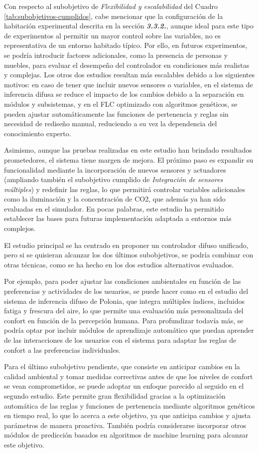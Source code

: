 Con respecto al subobjetivo de \textit{Flexibilidad y escalabilidad} del Cuadro \ref{tab:subobjetivos-cumplidos}, cabe mencionar que la configuración de la habitación experimental descrita en la sección \textbf{\textit{3.3.2.}}, aunque ideal para este tipo de experimentos al permitir un mayor control sobre las variables, no es representativa de un entorno habitado típico. Por ello, en futuros experimentos, se podría introducir factores adicionales, como la presencia de personas y muebles, para evaluar el desempeño del controlador en condiciones más realistas y complejas. Los otros dos estudios resultan más escalables debido a los siguientes motivos: en caso de tener que incluir nuevos sensores o variables, en el sistema de inferencia difusa se reduce el impacto de los cambios debido a la separación en módulos y subsistemas, y en el FLC optimizado con algoritmos genéticos, se pueden ajustar automáticamente las funciones de pertenencia y reglas sin necesidad de rediseño manual, reduciendo a su vez la dependencia del conocimiento experto.

Asimismo, aunque las pruebas realizadas en este estudio han brindado resultados prometedores, el sistema tiene margen de mejora. El próximo paso es expandir su funcionalidad mediante la incorporación de nuevos sensores y actuadores (ampliando también el subobjetivo cumplido de \textit{Integración de sensores múltiples}) y redefinir las reglas, lo que permitirá controlar variables adicionales como la iluminación y la concentración de CO2, que además ya han sido evaluadas en el simulador. En pocas palabras, este estudio ha permitido establecer las bases para futuras implementación adaptada a entornos más complejos.

El estudio principal se ha centrado en proponer un controlador difuso unificado, pero si se quisieran alcanzar los dos últimos subobjetivos, se podría combinar con otras técnicas, como se ha hecho en los dos estudios alternativos evaluados.

Por ejemplo, para poder ajustar las condiciones ambientales en función de las preferencias y actividades de los usuarios, se puede hacer como en el estudio del sistema de inferencia difuso de Polonia, que integra múltiples índices, incluidos fatiga y frescura del aire, lo que permite una evaluación más personalizada del confort en función de la percepción humana. Para profundizar todavía más, se podría optar por incluir módulos de aprendizaje automático que puedan aprender de las interacciones de los usuarios con el sistema para adaptar las reglas de confort a las preferencias individuales.

Para el último subobjetivo pendiente, que consiste en anticipar cambios en la calidad ambiental y tomar medidas correctivas antes de que los niveles de confort se vean comprometidos, se puede adoptar un enfoque parecido al seguido en el segundo estudio. Este permite gran flexibilidad gracias a la optimización automática de las reglas y funciones de pertenencia mediante algoritmos genéticos en tiempo real, lo que lo acerca a este objetivo, ya que anticipa cambios y ajusta parámetros de manera proactiva. También podría considerarse incorporar otros módulos de predicción basados en algoritmos de machine learning para alcanzar este objetivo.

